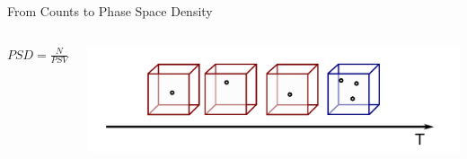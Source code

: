 \documentclass{beamer}
\begin{document}



\begin{frame}{From Counts to Phase Space Density}
\begin{columns}
	\column[]{2cm}
	\begin{mdframed}[roundcorner=4pt,userdefinedwidth=3.cm,
		align
		=center,
		linecolor
		=black,backgroundcolor=blue!8,
		linewidth
		=1.pt]
		$PSD = \frac{N}{PSV}$
	\end{mdframed}

	\column[]{6cm}
	
	\includegraphics[scale=.4]{Pics/norm_time.pdf}
\end{columns}



\end{frame}
\end{document}
